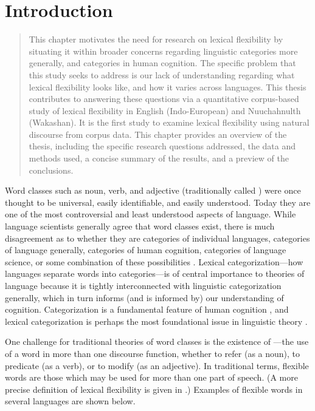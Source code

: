 \chapter{Introduction}
\label{ch:introduction}

\blockquote{This chapter motivates the need for research on lexical flexibility by situating it within broader concerns regarding linguistic categories more generally, and categories in human cognition. The specific problem that this study seeks to address is our lack of understanding regarding what lexical flexibility looks like, and how it varies across languages. This thesis contributes to answering these questions via a quantitative corpus-based study of lexical flexibility in English (Indo-European) and Nuuchahnulth (Wakashan). It is the first study to examine lexical flexibility using natural discourse from corpus data. This chapter provides an overview of the thesis, including the specific research questions addressed, the data and methods used, a concise summary of the results, and a preview of the conclusions.}

Word classes such as noun, verb, and adjective (traditionally called ) were once thought to be universal, easily identifiable, and easily understood. Today they are one of the most controversial and least understood aspects of language. While language scientists generally agree that word classes exist, there is much disagreement as to whether they are categories of individual languages, categories of language generally, categories of human cognition, categories of language science, or some combination of these possibilities . Lexical categorization—how languages separate words into categories—is of central importance to theories of language because it is tightly interconnected with linguistic categorization generally, which in turn informs (and is informed by) our understanding of cognition. Categorization is a fundamental feature of human cognition , and lexical categorization is perhaps the most foundational issue in linguistic theory .

One challenge for traditional theories of word classes is the existence of —the use of a word in more than one discourse function, whether to refer (as a noun), to predicate (as a verb), or to modify (as an adjective). In traditional terms, flexible words are those which may be used for more than one part of speech. (A more precise definition of lexical flexibility is given in .) Examples of flexible words in several languages are shown below.

